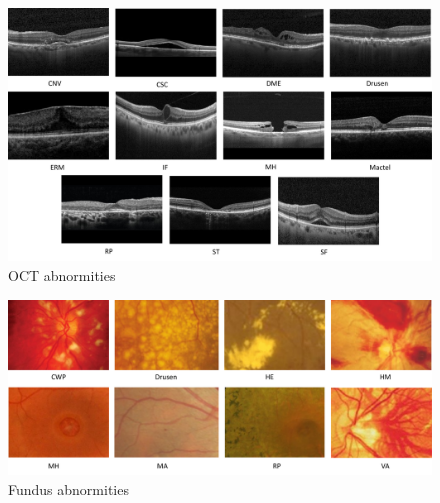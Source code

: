 \documentclass{article}
\begin{document}
	
	\begin{figure}[htbp]
		\centering
		\includegraphics[width=\linewidth]{Figs/OCT_Abnormities.pdf}
		\caption{OCT abnormities \autocite{Duker_Waheed_Goldman_2022}}
		\vspace{0.3cm}
		\label{fig:OCT_abnormities}
	\end{figure}
	
	\begin{figure}[htbp]
		\centering
		\includegraphics[width=\linewidth]{Figs/fundus_Abnormities.pdf}
		\caption{Fundus abnormities \autocite{Wolf_Kirchhof_Reim_2006}}
		\vspace{0.3cm}
		\label{fig:fundus_abnormities}
	\end{figure}
	
\end{document}

